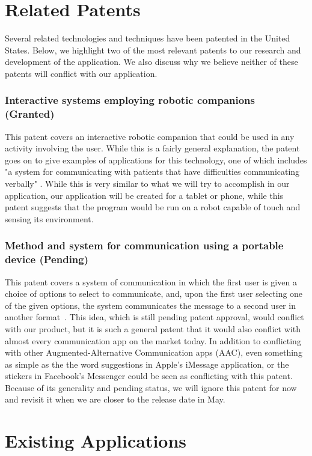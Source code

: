 \section{Related Patents}
Several related technologies and techniques have been patented in the United States. Below, we highlight two of the most relevant patents to our research and development of the application. We also discuss why we believe neither of these patents will conflict with our application.

\subsubsection{Interactive systems employing robotic companions (Granted)}
This patent covers an interactive robotic companion that could be used in any activity involving the user. While this is a fairly general explanation, the patent goes on to give examples of applications for this technology, one of which includes "a system for communicating with patients that have difficulties communicating verbally" \cite{stiehl}. While this is very similar to what we will try to accomplish in our application, our application will be created for a tablet or phone, while this patent suggests that the program would be run on a robot capable of touch and sensing its environment.

\subsubsection{Method and system for communication using a portable device (Pending)}
This patent covers a system of communication in which the first user is given a choice of options to select to communicate, and, upon the first user selecting one of the given options, the system communicates the message to a second user in another format~\cite{rashdan}. This idea, which is still pending patent approval, would conflict with our product, but it is such a general patent that it would also conflict with almost every communication app on the market today. In addition to conflicting with other Augmented-Alternative Communication apps (AAC), even something as simple as the the word suggestions in Apple's iMessage application, or the stickers in Facebook's Messenger could be seen as conflicting with this patent. Because of its generality and pending status, we will ignore this patent for now and revisit it when we are closer to the release date in May.

\section{Existing Applications}


